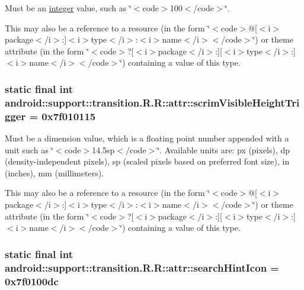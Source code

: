 Must be an \hyperlink{classandroid_1_1support_1_1transition_1_1_r_1_1integer}{integer} value, such as \char`\"{}$<$code$>$100$<$/code$>$\char`\"{}. 

This may also be a reference to a resource (in the form \char`\"{}$<$code$>$@\mbox{[}$<$i$>$package$<$/i$>$:\mbox{]}$<$i$>$type$<$/i$>$:$<$i$>$name$<$/i$>$$<$/code$>$\char`\"{}) or theme attribute (in the form \char`\"{}$<$code$>$?\mbox{[}$<$i$>$package$<$/i$>$:\mbox{]}\mbox{[}$<$i$>$type$<$/i$>$:\mbox{]}$<$i$>$name$<$/i$>$$<$/code$>$\char`\"{}) containing a value of this type. \hypertarget{classandroid_1_1support_1_1transition_1_1_r_1_1attr_f7ff89a47cf065c872604cdf6a9fe095}{
\subsubsection[{scrimVisibleHeightTrigger}]{\setlength{\rightskip}{0pt plus 5cm}static final int android::support::transition.R.R::attr::scrimVisibleHeightTrigger = 0x7f010115}}
\label{classandroid_1_1support_1_1transition_1_1_r_1_1attr_f7ff89a47cf065c872604cdf6a9fe095}


Must be a dimension value, which is a floating point number appended with a unit such as \char`\"{}$<$code$>$14.5sp$<$/code$>$\char`\"{}. Available units are: px (pixels), dp (density-independent pixels), sp (scaled pixels based on preferred font size), in (inches), mm (millimeters). 

This may also be a reference to a resource (in the form \char`\"{}$<$code$>$@\mbox{[}$<$i$>$package$<$/i$>$:\mbox{]}$<$i$>$type$<$/i$>$:$<$i$>$name$<$/i$>$$<$/code$>$\char`\"{}) or theme attribute (in the form \char`\"{}$<$code$>$?\mbox{[}$<$i$>$package$<$/i$>$:\mbox{]}\mbox{[}$<$i$>$type$<$/i$>$:\mbox{]}$<$i$>$name$<$/i$>$$<$/code$>$\char`\"{}) containing a value of this type. \hypertarget{classandroid_1_1support_1_1transition_1_1_r_1_1attr_047c68bf93201659985f5275eeb083b2}{
\subsubsection[{searchHintIcon}]{\setlength{\rightskip}{0pt plus 5cm}static final int android::support::transition.R.R::attr::searchHintIcon = 0x7f0100dc}}
\label{classandroid_1_1support_1_1transition_1_1_r_1_1attr_047c68bf93201659985f5275eeb083b2}


